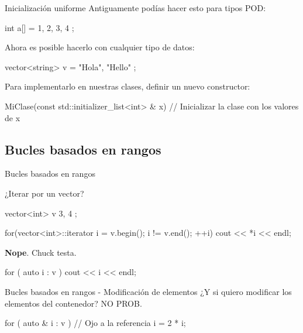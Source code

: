 \documentclass[8pt,xcolor=svgnames]{beamer}
\begin{document}
\begin{frame}[fragile]{Inicialización uniforme}
Antiguamente podías hacer esto para tipos POD:

\begin{cppcode}
int a[] = { 1, 2, 3, 4 };  
\end{cppcode}

\pause

Ahora es posible hacerlo con cualquier tipo de datos:

\begin{cppcode}
vector<string> v = { "Hola", "Hello" };  
\end{cppcode}

\pause 

Para implementarlo en nuestras clases, definir un nuevo constructor:

\begin{cppcode}
MiClase(const std::initializer_list<int> & x) {
    // Inicializar la clase con los valores de x
}  
\end{cppcode}
\end{frame}

\subsection{Bucles basados en rangos}
\begin{frame}[fragile]{Bucles basados en rangos}

¿Iterar por un vector?

  \begin{cppcode}
vector<int> v { 3, 4 };

for(vector<int>::iterator i = v.begin(); i != v.end(); ++i) {
    cout << *i << endl;
}
  \end{cppcode}

\pause

\textbf{Nope}. Chuck testa.

\begin{cppcode}
for ( auto i : v ) {
    cout << i << endl;
}
\end{cppcode}
\end{frame}

\begin{frame}[fragile]{Bucles basados en rangos - Modificación de elementos}
 ¿Y si quiero modificar los elementos del contenedor? NO PROB.  

 \begin{cppcode}
for ( auto & i : v ){ // Ojo a la referencia
    i = 2 * i;
}   
 \end{cppcode}
\end{frame}
\end{document}
